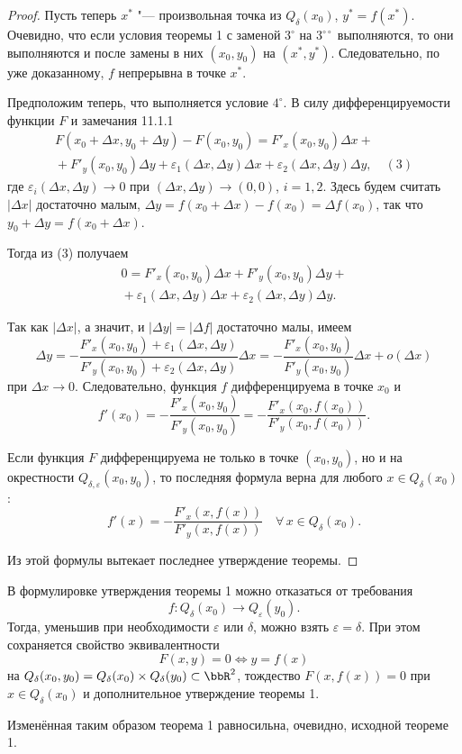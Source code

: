 \begin{proof}
Пусть теперь $x^*$ "--- произвольная точка из $Q_\delta(x_0)$, $y^* = f(x^*)$. Очевидно, что если условия теоремы 1 с заменой $3^\circ$ на $3^{\circ\circ}$ выполняются, то они выполняются и после замены в них $(x_0, y_0)$ на $(x^*, y^*)$. Следовательно, по уже доказанному, $f$ непрерывна в точке $x^*$.

Предположим теперь, что выполняется условие $4^\circ$. В силу дифференцируемости функции $F$ и замечания 11.1.1
\begin{multline} \label{eq3}
F(x_0 + \Delta x, y_0 + \Delta y) - F(x_0, y_0) = F'_x(x_0, y_0)\Delta x + {} \\
{} + F'_y(x_0, y_0)\Delta y + \varepsilon_1(\Delta x, \Delta y)\Delta x + \varepsilon_2(\Delta x, \Delta y)\Delta y, \quad (3)
\end{multline}
где $\varepsilon_i(\Delta x, \Delta y) \to 0$ при $(\Delta x, \Delta y) \to (0, 0)$, $i = 1, 2$. Здесь будем считать $|\Delta x|$ достаточно малым, $\Delta y = f(x_0 + \Delta x) - f(x_0) = \Delta f(x_0)$, так что $y_0 + \Delta y = f(x_0 + \Delta x)$.

Тогда из (3) получаем
\begin{multline*}
0 = F'_x(x_0, y_0)\Delta x + F'_y(x_0, y_0)\Delta y + {} \\
{} + \varepsilon_1(\Delta x, \Delta y)\Delta x + \varepsilon_2(\Delta x, \Delta y)\Delta y.
\end{multline*}

Так как $|\Delta x|$, а значит, и $|\Delta y| = |\Delta f|$ достаточно малы, имеем
$$
\Delta y = - \frac{F'_x(x_0, y_0) + \varepsilon_1(\Delta x, \Delta y)}{F'_y(x_0, y_0) + \varepsilon_2(\Delta x, \Delta y)}\Delta x = - \frac{F'_x(x_0, y_0)}{F'_y(x_0, y_0)}\Delta x + o(\Delta x)
$$
при $\Delta x \to 0$. Следовательно, функция $f$ дифференцируема в точке $x_0$ и
$$
f'(x_0) = - \frac{F'_x(x_0, y_0)}{F'_y(x_0, y_0)} = - \frac{F'_x(x_0, f(x_0))}{F'_y(x_0, f(x_0))}.
$$

Если функция $F$ дифференцируема не только в точке $(x_0, y_0)$, но и на окрестности $Q_{\delta, \varepsilon}(x_0, y_0)$, то последняя формула верна для любого $x \in Q_\delta(x_0)$:
$$
f'(x) = - \frac{F'_x(x, f(x))}{F'_y(x, f(x))} \quad \forall\, x \in Q_\delta(x_0).
$$

Из этой формулы вытекает последнее утверждение теоремы.
\end{proof}

\begin{notion}
В формулировке утверждения теоремы 1 можно отказаться от требования
$$
f \colon Q_\delta(x_0) \to Q_\varepsilon(y_0).
$$
Тогда, уменьшив при необходимости $\varepsilon$ или $\delta$, можно взять $\varepsilon = \delta$. При этом сохраняется свойство эквивалентности
$$
F(x, y) = 0 \iff y = f(x)
$$
на $Q_\delta(x_0, y_0) = Q_\delta(x_0) \times Q_\delta(y_0) \subset \bbR^2$, тождество $F(x, f(x)) = 0$ при $x \in Q_\delta(x_0)$ и дополнительное утверждение теоремы 1.

Изменённая таким образом теорема 1 равносильна, очевидно, исходной теореме 1.
\end{notion}
